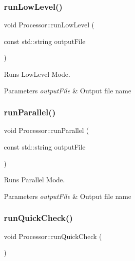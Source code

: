 \subsubsection{\texorpdfstring{run\+Low\+Level()}{runLowLevel()}}
{\footnotesize\ttfamily void Processor\+::run\+Low\+Level (\begin{DoxyParamCaption}\item[{const std\+::string}]{output\+File }\end{DoxyParamCaption})\hspace{0.3cm}{\ttfamily [private]}}



Runs Low\+Level Mode. 


\begin{DoxyParams}{Parameters}
{\em output\+File} & Output file name \\
\hline
\end{DoxyParams}
\mbox{\label{class_processor_a32965f4a6587e9bf54eeeb11de43a4ad}} 
\subsubsection{\texorpdfstring{run\+Parallel()}{runParallel()}}
{\footnotesize\ttfamily void Processor\+::run\+Parallel (\begin{DoxyParamCaption}\item[{const std\+::string}]{output\+File }\end{DoxyParamCaption})\hspace{0.3cm}{\ttfamily [private]}}



Runs Parallel Mode. 


\begin{DoxyParams}{Parameters}
{\em output\+File} & Output file name \\
\hline
\end{DoxyParams}
\mbox{\label{class_processor_aa04640b32910d2daae25306f35ddcad8}} 
\subsubsection{\texorpdfstring{run\+Quick\+Check()}{runQuickCheck()}}
{\footnotesize\ttfamily void Processor\+::run\+Quick\+Check (\begin{DoxyParamCaption}{ }\end{DoxyParamCaption})\hspace{0.3cm}{\ttfamily [private]}}




